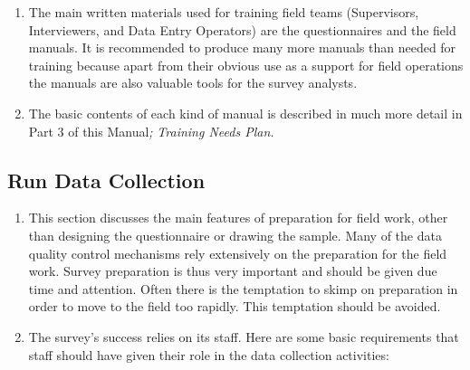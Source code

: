 \documentclass[
]{article}
\begin{document}
\begin{enumerate}
\def\labelenumi{\arabic{enumi}.}
\setcounter{enumi}{341}
\item
  The main written materials used for training field teams
  (Supervisors, Interviewers, and Data Entry Operators) are the
  questionnaires and the field manuals. It is recommended to produce
  many more manuals than needed for training because apart from their
  obvious use as a support for field operations the manuals are also
  valuable tools for the survey analysts.
\item
  The basic contents of each kind of manual is described in much more
  detail in Part 3 of this Manual\emph{;} \emph{Training Needs Plan. }
\end{enumerate}

\hypertarget{run-data-collection-1}{%
\subsection{Run Data Collection}\label{run-data-collection-1}}

\begin{enumerate}
\def\labelenumi{\arabic{enumi}.}
\setcounter{enumi}{343}
\item
  This section discusses the main features of preparation for field
  work, other than designing the questionnaire or drawing the sample.
  Many of the data quality control mechanisms rely extensively on the
  preparation for the field work. Survey preparation is thus very
  important and should be given due time and attention. Often there is
  the temptation to skimp on preparation in order to move to the field
  too rapidly. This temptation should be avoided.
\item
  The survey's success relies on its staff. Here are some basic
  requirements that staff should have given their role in the data
  collection activities:
\end{enumerate}
\end{document}
